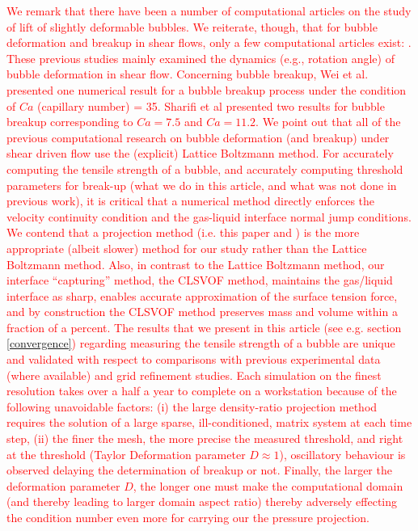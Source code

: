 \documentclass{elsarticle}
\begin{document}
\textcolor{red} {
	We remark that there have been a number of computational articles on the study of lift of slightly deformable bubbles\cite{ErvinANDTryggvason1997,legendre1998lift}.  We reiterate, though, that for bubble deformation and breakup in shear flows, only a few computational articles exist: \cite{WeiQiaXu12,WanShiZha15,AAMM-16-2}.  These previous studies mainly examined the dynamics (e.g., rotation angle) of bubble deformation in shear flow.  Concerning bubble breakup, Wei et al.~\cite{WeiQiaXu12} presented one numerical result for a bubble breakup process under the condition of $Ca$ (capillary number) = 35. Sharifi et al\cite{AAMM-16-2} presented two results for bubble breakup corresponding to $Ca=7.5$ and $Ca=11.2$.  We point out that all of the previous computational research on bubble deformation (and breakup) under shear driven flow\cite{WeiQiaXu12,WanShiZha15,AAMM-16-2} use the (explicit) Lattice Boltzmann method.  For accurately computing the tensile strength of a bubble, and accurately computing threshold parameters for break-up (what we do in this article, and what was not done in previous work), it is critical that a numerical method directly enforces the velocity continuity condition and the gas-liquid interface normal jump conditions.  We contend that a projection method (i.e. this paper and \cite{zhang2021three,zhang2022three,OhtSus12}) is the more appropriate (albeit slower) method for our study rather than the Lattice Boltzmann method.  Also, in contrast to the Lattice Boltzmann method, our interface ``capturing'' method, the CLSVOF method\cite{SusPuc00,SusSmiHusOhtZhi07}, maintains the gas/liquid interface as sharp, enables accurate approximation of the surface tension force,  and by construction the CLSVOF method preserves mass and volume within a fraction of a percent. The results that we present in this article (see e.g. section \ref{convergence}) regarding measuring the tensile strength of a bubble are unique and validated with respect to comparisons with previous experimental data (where available) and grid refinement studies.  Each simulation on the finest resolution takes over a half a year to complete on a workstation because of the following unavoidable factors: (i) the large density-ratio projection method requires the solution of a large sparse, ill-conditioned, matrix system at each time step, (ii) the finer the mesh, the more precise the measured threshold, and right at the threshold (Taylor Deformation parameter $D\approx 1$), oscillatory behaviour is observed delaying the determination of breakup or not.  Finally, the larger the deformation parameter $D$, the longer one must make the computational domain (and thereby leading to larger domain aspect ratio) thereby adversely effecting the condition number even more for carrying our the pressure projection. 
}
\end{document}
